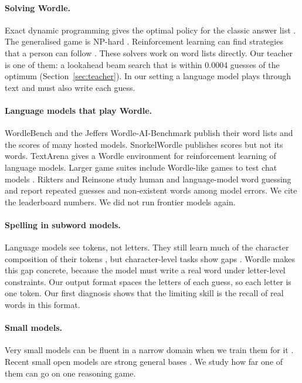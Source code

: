 \documentclass{article}
\begin{document}
\paragraph{Solving Wordle.} Exact dynamic programming gives the optimal policy for the classic answer list \citep{bertsimas2022wordle}. The generalised game is NP-hard \citep{lokshtanov2022wordle,rosenbaum2022wordle}. Reinforcement learning can find strategies that a person can follow \citep{anderson2022wordle}. These solvers work on word lists directly. Our teacher is one of them: a lookahead beam search that is within 0.0004 guesses of the optimum (Section~\ref{sec:teacher}). In our setting a language model plays through text and must also write each guess.

\paragraph{Language models that play Wordle.} WordleBench \citep{wordlebench} and the Jeffers Wordle-AI-Benchmark \citep{jeffers} publish their word lists and the scores of many hosted models. SnorkelWordle \citep{snorkelwordle} publishes scores but not its words. TextArena \citep{guertler2025textarena} gives a Wordle environment for reinforcement learning of language models. Larger game suites include Wordle-like games to test chat models \citep{chalamalasetti2023clembench,wu2023smartplay}. Rikters and Reinsone \citep{rikters2024strategic} study human and language-model word guessing and report repeated guesses and non-existent words among model errors. We cite the leaderboard numbers. We did not run frontier models again.

\paragraph{Spelling in subword models.} Language models see tokens, not letters. They still learn much of the character composition of their tokens \citep{itzhak2022spelling,kaushal2022tokens}, but character-level tasks show gaps \citep{edman2024cute}. Wordle makes this gap concrete, because the model must write a real word under letter-level constraints. Our output format spaces the letters of each guess, so each letter is one token. Our first diagnosis shows that the limiting skill is the recall of real words in this format.

\paragraph{Small models.} Very small models can be fluent in a narrow domain when we train them for it \citep{eldan2023tinystories}. Recent small open models are strong general bases \citep{allal2025smollm2,gemma3}. We study how far one of them can go on one reasoning game.
\end{document}

